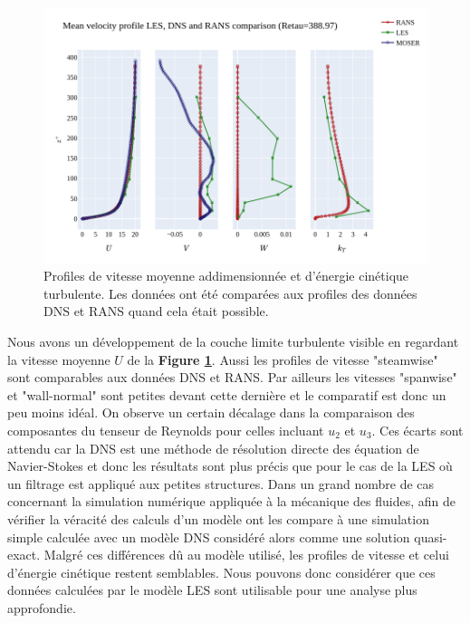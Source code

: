 \documentclass[12pt]{article}
\theoremstyle{plain}
\theoremstyle{remark}
\begin{document}
\begin{figure}[H]
	\begin{center}
		\includegraphics[width=0.8\linewidth]{../../output/figures/channel_wrles_retau395/split_time/RANS/RANS_LES_MOSER_profiles_all.png}
		\caption{Profiles de vitesse moyenne addimensionnée et d'énergie cinétique turbulente. Les données ont été comparées aux profiles des données DNS et RANS quand cela était possible.}
		\label{fig:mean-vel}
	\end{center}
\end{figure}

Nous avons un développement de la couche limite turbulente visible en regardant la vitesse moyenne $U$ de la \textbf{Figure \ref{fig:mean-vel}}. Aussi les profiles de vitesse "steamwise" sont comparables aux données DNS et RANS. Par ailleurs les vitesses "spanwise" et "wall-normal" sont petites devant cette dernière et le comparatif est donc un peu moins idéal. On observe un certain décalage dans la comparaison des composantes du tenseur de Reynolds pour celles incluant $u_2$ et $u_3$. Ces écarts sont attendu car la DNS est une méthode de résolution directe des équation de Navier-Stokes et donc les résultats sont plus précis que pour le cas de la LES où un filtrage est appliqué aux petites structures. Dans un grand nombre de cas concernant la simulation numérique appliquée à la mécanique des fluides, afin de vérifier la véracité des calculs d'un modèle ont les compare à une simulation simple calculée avec un modèle DNS considéré alors comme une solution quasi-exact. Malgré ces différences dû au modèle utilisé, les profiles de vitesse et celui d'énergie cinétique restent semblables. Nous pouvons donc considérer que ces données calculées par le modèle LES sont utilisable pour une analyse plus approfondie. \\
\end{document}
